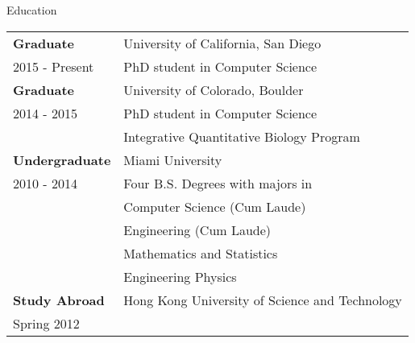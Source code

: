 \documentclass{resume} %
\begin{document}
\begin{rSection}{Education}
  \begin{tabular}{ll}
    \textbf{Graduate}    & University of California, San Diego  \\
    2015 - Present  & PhD student in Computer Science \\
    \textbf{Graduate}    & University of Colorado, Boulder \\
    2014 - 2015  & PhD student in Computer Science \\
                    & Integrative Quantitative Biology Program \\
    \textbf{Undergraduate}    & Miami University \\
    2010 - 2014   & Four B.S. Degrees with majors in\\
    & Computer Science (Cum Laude)\\
    & Engineering (Cum Laude)\\
    & Mathematics and Statistics \\
    & Engineering Physics \\
    \textbf{Study Abroad} &  Hong Kong University of Science and Technology   \\
    Spring 2012 \\
  \end{tabular}
\end{rSection}
\end{document}
